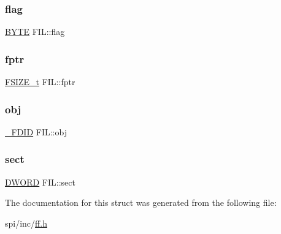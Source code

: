 \mbox{\label{struct_f_i_l_ac409508881f5a16f2998ae675072b376}} 
\subsubsection{\texorpdfstring{flag}{flag}}
{\footnotesize\ttfamily \mbox{\hyperlink{lz4_8c_a4ae1dab0fb4b072a66584546209e7d58}{B\+Y\+TE}} F\+I\+L\+::flag}

\mbox{\label{struct_f_i_l_a088b03ab2e02f82e10e17bdd938190a6}} 
\subsubsection{\texorpdfstring{fptr}{fptr}}
{\footnotesize\ttfamily \mbox{\hyperlink{ff_8h_a3fc0992ad7436250b6b1a0592214b7f2}{F\+S\+I\+Z\+E\+\_\+t}} F\+I\+L\+::fptr}

\mbox{\label{struct_f_i_l_ae7242545ea88ea2602484122ebe65fa3}} 
\subsubsection{\texorpdfstring{obj}{obj}}
{\footnotesize\ttfamily \mbox{\hyperlink{struct___f_d_i_d}{\+\_\+\+F\+D\+ID}} F\+I\+L\+::obj}

\mbox{\label{struct_f_i_l_affec18b48fe716fdae6a60123fc61145}} 
\subsubsection{\texorpdfstring{sect}{sect}}
{\footnotesize\ttfamily \mbox{\hyperlink{integer_8h_ad342ac907eb044443153a22f964bf0af}{D\+W\+O\+RD}} F\+I\+L\+::sect}



The documentation for this struct was generated from the following file\+:\begin{DoxyCompactItemize}
\item 
spi/inc/\mbox{\hyperlink{ff_8h}{ff.\+h}}\end{DoxyCompactItemize}
